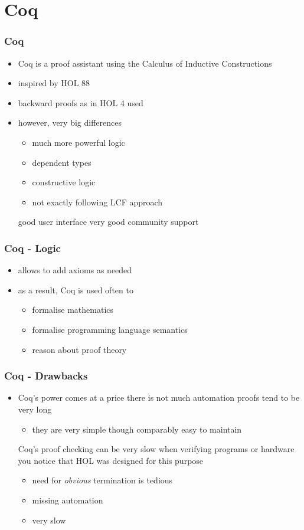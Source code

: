 \section{Coq}
\begin{frame}
\frametitle{Coq}

\begin{itemize}
\item Coq is a proof assistant using the Calculus of Inductive Constructions
\item inspired by HOL 88
\item backward proofs as in HOL 4 used
\item however, very big differences
\begin{itemize}
\item much more powerful logic
\item dependent types
\item constructive logic
\item not exactly following LCF approach
\end{itemize}
\pro good user interface
\pro very good community support
\end{itemize}
\end{frame}


\begin{frame}
\frametitle{Coq - Logic}

\begin{itemize}
\pro Coq's logic is very powerful
\pro it is very natural for mathematicians
\pro very natural for language theory
\pro allows reasoning about proofs
\item allows to add axioms as needed
\item as a result, Coq is used often to
\begin{itemize}
\item formalise mathematics
\item formalise programming language semantics
\item reason about proof theory
\end{itemize}
\end{itemize}
\end{frame}


\begin{frame}
\frametitle{Coq - Drawbacks}

\begin{itemize}
\item Coq's power comes at a price
\con there is not much automation
\con proofs tend to be very long
\begin{itemize}
\item they are very simple though
\pro comparably easy to maintain
\end{itemize}
\con Coq's proof checking can be very slow
\con when verifying programs or hardware you notice that HOL was designed for this purpose
\begin{itemize}
\item need for \emph{obvious} termination is tedious
\item missing automation
\item very slow
\end{itemize}
\end{itemize}
\end{frame}


